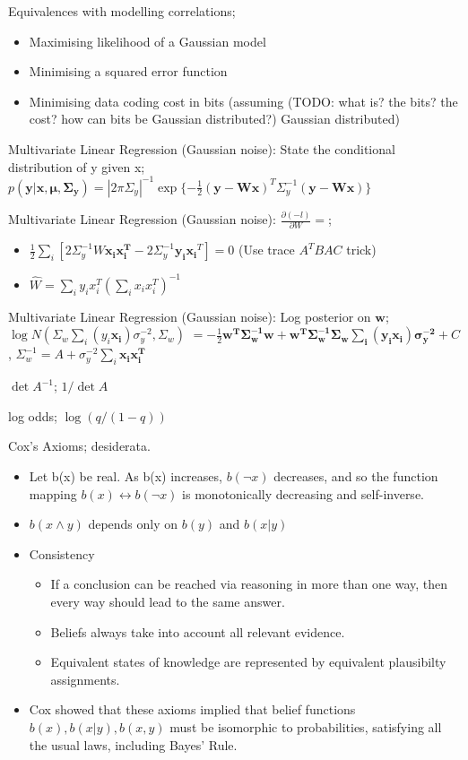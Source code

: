 \documentclass{article}
\begin{document}
Equivalences with modelling correlations; \begin{itemize} \item Maximising likelihood of a Gaussian model \item Minimising a squared error function \item Minimising data coding cost in bits (assuming (TODO: what is? the bits? the cost? how can bits be Gaussian distributed?) Gaussian distributed) \end{itemize}

Multivariate Linear Regression (Gaussian noise): State the conditional distribution of y given x; $p(\mathbf{y|x, \mu, \Sigma_y}) = |2\pi\Sigma_y|^{-1}\exp\{-\frac{1}{2}(\mathbf{y-Wx})^T\Sigma_y^{-1}(\mathbf{y-Wx})\}$

Multivariate Linear Regression (Gaussian noise): $\frac{\partial(-l)}{\partial W} = $; \begin{itemize} \item $\frac{1}{2}\sum_i [2\Sigma^{-1}_yW\mathbf{x_ix_i^T}-2\Sigma_y^{-1}\mathbf{y_ix_i}^T]=0$ (Use trace $A^TBAC$ trick) \item $\hat{W} = \sum_i y_ix_i^T(\sum_i x_i x_i^T)^{-1}$ \end{itemize}


Multivariate Linear Regression (Gaussian noise): Log posterior on $\mathbf{w}$; $\log N(\Sigma_w\sum_i(y_i\mathbf{x_i})\sigma^{-2}_y,\Sigma_w)$ $ = -\frac{1}{2}\mathbf{w^T\Sigma_w^{-1}w+w^T\Sigma^{-1}_w\Sigma_w\sum_i(y_i\mathbf{x_i})\sigma_y^{-2}}+C$, $\Sigma_w^{-1} = A+\sigma_y^{-2}\sum_i \mathbf{x_ix_i^T}$

$\det A^{-1}$; $1/\det A$

log odds; $\log(q/(1-q))$

Cox's Axioms; desiderata. \begin{itemize} \item Let b(x) be real. As b(x) increases, $b(\neg x)$ decreases, and so the function mapping $b(x) \leftrightarrow b(\neg x)$ is monotonically decreasing and self-inverse.  \item $b(x \wedge y)$ depends only on $b(y)$ and $b(x|y)$ \item Consistency \begin{itemize} \item If a conclusion can be reached via reasoning in more than one way, then every way should lead to the same answer.  \item Beliefs always take into account all relevant evidence.  \item Equivalent states of knowledge are represented by equivalent plausibilty assignments.  \end{itemize} \item Cox showed that these axioms implied that belief functions $b(x), b(x|y), b(x,y)$ must be isomorphic to probabilities, satisfying all the usual laws, including Bayes' Rule.  \end{itemize} 
            
\end{document}
